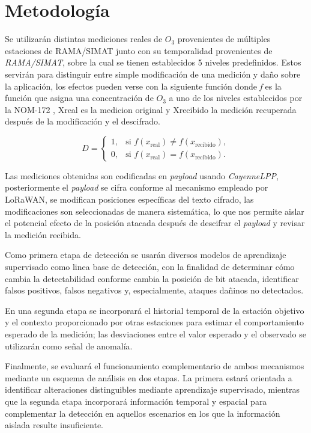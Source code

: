 \section{Metodología}

Se utilizarán distintas mediciones reales de $O_3$ provenientes de múltiples estaciones de RAMA/SIMAT junto con su temporalidad provenientes de \textit{RAMA/SIMAT}, sobre la cual se tienen establecidos 5 niveles predefinidos. Estos servirán para distinguir entre simple modificación de una medición y daño sobre la aplicación, los efectos pueden verse con la siguiente función donde \textit{f} es la función que asigna una concentración de $O_3$ a uno de los niveles establecidos por la NOM-172 \cite{nom172_semarnat_2024} , Xreal es la medicion original y Xrecibido la medición recuperada después de la modificación y el descifrado.

\[
D =
\begin{cases}
1, & \text{si } f\left(x_{\text{real}}\right) \neq f\left(x_{\text{recibido}}\right),\\
0, & \text{si } f\left(x_{\text{real}}\right) = f\left(x_{\text{recibido}}\right).
\end{cases}
\]


Las mediciones obtenidas son codificadas en \textit{payload} usando \textit{CayenneLPP}, posteriormente el \textit{payload} se cifra conforme al mecanismo empleado por LoRaWAN, se modifican posiciones específicas del texto cifrado, las modificaciones son seleccionadas de manera sistemática, lo que nos permite aislar el potencial efecto de la posición atacada después de descifrar el \textit{payload} y revisar la medición recibida. 

Como primera etapa de detección se usarán diversos modelos de aprendizaje supervisado como linea base de detección, con la finalidad de determinar cómo cambia la detectabilidad conforme cambia la posición de bit atacada, identificar falsos positivos, falsos negativos y, especialmente, ataques dañinos no detectados.

En una segunda etapa se incorporará el historial temporal de la estación objetivo y el contexto proporcionado por otras estaciones para estimar el comportamiento esperado de la medición; las desviaciones entre el valor esperado y el observado se utilizarán como señal de anomalía.

Finalmente, se evaluará el funcionamiento complementario de ambos mecanismos mediante un esquema de análisis en dos etapas. La primera estará orientada a identificar alteraciones distinguibles mediante aprendizaje supervisado, mientras que la segunda etapa incorporará información temporal y espacial para complementar la detección en aquellos escenarios en los que la información aislada resulte insuficiente.

